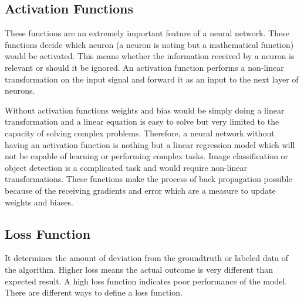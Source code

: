 \documentclass[11pt]{article}
\begin{document}

\subsection{Activation Functions}
These functions are an extremely important feature of a neural network. These functions decide which neuron (a neuron is noting but a mathematical function) would be activated. This means whether the information received by a neuron is relevant or should it be ignored. An activation function performs a non-linear transformation on the input signal and forward it as an input to the next layer of neurons.

Without activation functions weights and bias would be simply doing a linear transformation and a linear equation is easy to solve but very limited to the capacity of solving complex problems. Therefore, a neural network without having an activation function is nothing but a linear regression model which will not be capable of learning or performing complex tasks. Image classification or object detection is a complicated task and would require non-linear transformations. These functions make the process of back propagation possible because of the receiving gradients and error which are a measure to update weights and biases.

\subsection{Loss Function}
It determines the amount of deviation from the groundtruth or labeled data of the algorithm. Higher loss means the actual outcome is very different than expected result. A high loss function indicates poor performance of the model. There are different ways to define a loss function.
\end{document}
